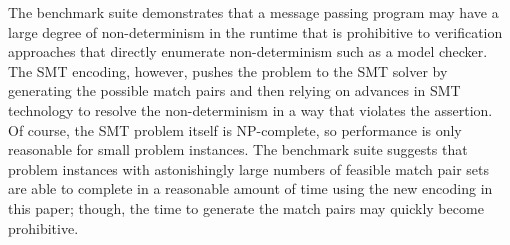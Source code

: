 The benchmark suite demonstrates that a message passing program may
have a large degree of non-determinism in the runtime that is
prohibitive to verification approaches that directly enumerate
non-determinism such as a model checker. The SMT encoding, however,
pushes the problem to the SMT solver by generating the possible
match pairs and then relying on advances in SMT technology to resolve
the non-determinism in a way that violates the assertion. Of course,
the SMT problem itself is NP-complete, so performance is only
reasonable for small problem instances. The benchmark suite suggests
that problem instances with astonishingly large numbers of feasible
match pair sets are able to complete in a reasonable amount of time
using the new encoding in this paper; though, the time to generate the
match pairs may quickly become prohibitive.

